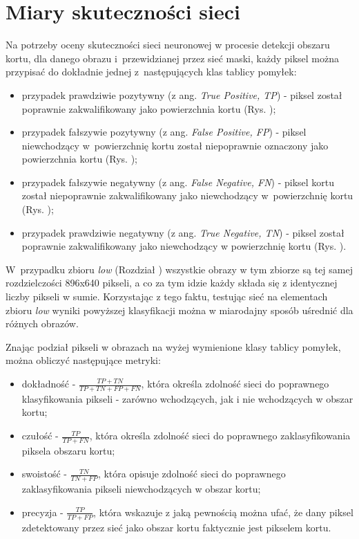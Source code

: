 \section{Miary skuteczności sieci}

Na potrzeby oceny skuteczności sieci neuronowej w procesie detekcji obszaru kortu, dla danego obrazu i~przewidzianej przez sieć maski, każdy piksel można przypisać do dokładnie jednej z~następujących klas tablicy pomyłek:

\begin{itemize}
  \item przypadek prawdziwie pozytywny (z ang. \textit{True Positive, TP}) - piksel został poprawnie zakwalifikowany jako powierzchnia kortu (Rys. );
  \item przypadek fałszywie pozytywny (z ang. \textit{False Positive, FP}) - piksel niewchodzący w~powierzchnię kortu został niepoprawnie oznaczony jako powierzchnia kortu (Rys. );
  \item przypadek fałszywie negatywny (z ang. \textit{False Negative, FN}) - piksel kortu został niepoprawnie zakwalifikowany jako niewchodzący w~powierzchnię kortu (Rys. );
  \item przypadek prawdziwie negatywny (z ang. \textit{True Negative, TN}) - piksel został poprawnie zakwalifikowany jako niewchodzący w powierzchnię kortu (Rys. ).
\end{itemize}

W~przypadku zbioru \textit{low} (Rozdział ) wszystkie obrazy w tym zbiorze są tej samej rozdzielczości 896x640 pikseli, a co za tym idzie każdy składa się z identycznej liczby pikseli w sumie.
Korzystając z tego faktu, testując sieć na elementach zbioru \textit{low} wyniki powyższej klasyfikacji można w miarodajny sposób uśrednić dla różnych obrazów.

Znając podział pikseli w obrazach na wyżej wymienione klasy tablicy pomyłek, można obliczyć następujące metryki:

\begin{itemize}
  \label{sec:miary}
  \item dokładność - $ \frac{TP + TN}{TP + TN + FP + FN} $, która określa zdolność sieci do poprawnego klasyfikowania pikseli - zarówno wchodzących, jak i nie wchodzących w obszar kortu;
  \item czułość - $ \frac{TP}{TP + FN} $, która określa zdolność sieci do poprawnego zaklasyfikowania piksela obszaru kortu;
  \item swoistość - $ \frac{TN}{TN + FP} $, która opisuje zdolność sieci do poprawnego zaklasyfikowania pikseli niewchodzących w obszar kortu; 
  \item precyzja - $ \frac{TP}{TP + FP} $, która wskazuje z jaką pewnością można ufać, że dany piksel zdetektowany przez sieć jako obszar kortu faktycznie jest pikselem kortu.
\end{itemize}

